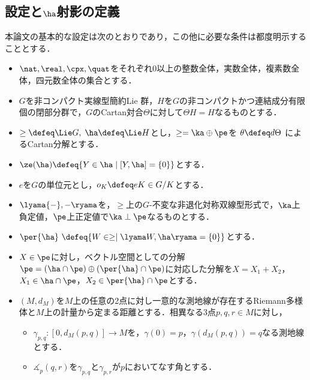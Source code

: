 
\newcommand*\ccircled[4]{\tikz[baseline=(char.base)]{
    \node[shape=circle, fill=#2, draw=#3, text=#4, inner sep=1pt] (char) {#1};}}
\newcommand{\cnum}[1]{\ccircled{#1}{MediumTurquoise!40}{MediumTurquoise!40}{black}}

\subsection{設定と$\ha$射影の定義}
本論文の基本的な設定は次のとおりであり，この他に必要な条件は都度明示することとする．

\begin{nttdef}\label{nttdef:fund}
  \leavevmode\vspace{-1em}
  \begin{itemize}
  \item $\nat,\real, \cpx,\quat$をそれぞれ0以上の整数全体，実数全体，複素数全体，四元数全体の集合とする．
  \item $G$を非コンパクト実線型簡約Lie 群，$H$を$G$の非コンパクトかつ連結成分有限個の閉部分群で，$G$のCartan対合$\Theta$に対して$\Theta H = H$なるものとする．

  \item $\ge \defeq \Lie G,\; \ha \defeq \Lie H$とし，$\ge = \ka\oplus \pe$を $\theta \defeq d\Theta$ によるCartan分解とする．
  \item $\ze(\ha)\defeq \{Y\in \ha\mid [Y,\ha] = \{0\} \} $とする．
  \item $e$を$G$の単位元とし，$o_K \defeq eK\in G/K$とする．
  \item $\lyama{-},{-} \ryama$を，$\ge$上の$G$-不変な非退化対称双線型形式で，$\ka$上負定値，$\pe$上正定値で$\ka\perp \pe$なるものとする．
  \item $\per{\ha}\ \defeq \{W\in \ge\mid \lyama W, \ha\ryama = \{0\}\} $とする．
  \item $X\in \pe$に対し，ベクトル空間としての分解$\pe =( \ha\cap \pe)\oplus(\per{\ha}\cap \pe) $に対応した分解を$X = X_1 + X_2 $，$X_1 \in \ha\cap \pe$，$X_2\in \per{\ha}\cap \pe$とする．
  \item $(M,d_M)$を$M$上の任意の2点に対し一意的な測地線が存在するRiemann多様体と$M$上の計量から定まる距離とする．相異なる3点$p,q,r \in M$に対し，
    \begin{itemize}
    \item $\gamma_{p,q}\colon [0, d_{M}(p,q)] \to M$を，$\gamma(0) =  p$，$\gamma(d_{M}(p,q)) = q $なる測地線とする．
    \item $\measuredangle_{p}(q, r)$を$\gamma_{p,q} $と$\gamma_{p,r} $が$p$においてなす角とする．
    \end{itemize}
  \end{itemize}  
\end{nttdef}

